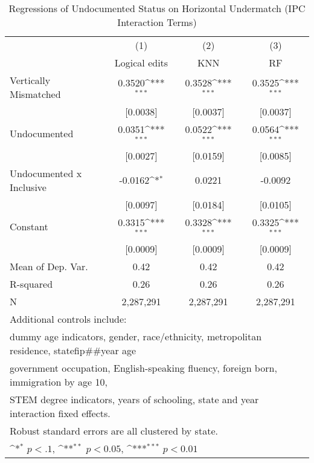 \begin{table}[htbp]\centering
\def\sym#1{\ifmmode^{#1}\else\(^{#1}\)\fi}
\caption{Regressions of Undocumented Status on Horizontal Undermatch (IPC Interaction Terms)}
\begin{tabular}{l*{3}{c}}
\toprule
                    &\multicolumn{1}{c}{(1)}         &\multicolumn{1}{c}{(2)}         &\multicolumn{1}{c}{(3)}         \\
                    &Logical edits         &         KNN         &          RF         \\
\midrule
Vertically Mismatched&      0.3520\sym{***}&      0.3528\sym{***}&      0.3525\sym{***}\\
                    &    [0.0038]         &    [0.0037]         &    [0.0037]         \\
\addlinespace
Undocumented        &      0.0351\sym{***}&      0.0522\sym{***}&      0.0564\sym{***}\\
                    &    [0.0027]         &    [0.0159]         &    [0.0085]         \\
\addlinespace
Undocumented x Inclusive&     -0.0162\sym{*}  &      0.0221         &     -0.0092         \\
                    &    [0.0097]         &    [0.0184]         &    [0.0105]         \\
\addlinespace
Constant            &      0.3315\sym{***}&      0.3328\sym{***}&      0.3325\sym{***}\\
                    &    [0.0009]         &    [0.0009]         &    [0.0009]         \\
\midrule
Mean of Dep. Var.   &        0.42         &        0.42         &        0.42         \\
R-squared           &        0.26         &        0.26         &        0.26         \\
N                   &   2,287,291         &   2,287,291         &   2,287,291         \\
\bottomrule
\multicolumn{4}{l}{\footnotesize Additional controls include:}\\
\multicolumn{4}{l}{\footnotesize dummy age indicators, gender, race/ethnicity, metropolitan residence, statefip##year age}\\
\multicolumn{4}{l}{\footnotesize government occupation, English-speaking fluency, foreign born, immigration by age 10,}\\
\multicolumn{4}{l}{\footnotesize STEM degree indicators, years of schooling, state and year interaction fixed effects.}\\
\multicolumn{4}{l}{\footnotesize Robust standard errors are all clustered by state.}\\
\multicolumn{4}{l}{\footnotesize \sym{*} \(p<.1\), \sym{**} \(p<0.05\), \sym{***} \(p<0.01\)}\\
\end{tabular}
\end{table}
